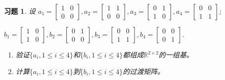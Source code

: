 \documentclass[UTF8]{ctexart}
\newtheorem{ex}[thm]{习题}
\begin{document}
\begin{ex} %
设 $a_{1} = \begin{bmatrix}
1 & 0 \\
0 & 0
\end{bmatrix}, a_{2} =\begin{bmatrix}
1 & 1 \\
0 & 0
\end{bmatrix}, a_{3} =\begin{bmatrix}
0 & 1 \\
1 & 0
\end{bmatrix}, a_{4} = \begin{bmatrix}
0 & 0 \\
1 & 1
\end{bmatrix}$;
\

$b_{1} = \begin{bmatrix}
1 & 0 \\
1 & 0
\end{bmatrix}, b_{2} =\begin{bmatrix}
0 & 1 \\
0 & 0
\end{bmatrix}, b_{3} =\begin{bmatrix}
0 & 0 \\
1 & 1
\end{bmatrix}, b_{4} = \begin{bmatrix}
0 & 0 \\
0 & 1
\end{bmatrix}$.
\begin{enumerate}
\item
验证$\{a_{i}, 1 \leq i \leq 4\}$和$\{b_{i}, 1 \leq i \leq 4\}$都组成$\mathbb{R}^{2 \times 2}$的一组基。
\item
计算$\{a_{i}, 1 \leq i \leq 4\}$到$\{b_{i}, 1 \leq i \leq 4\}$的过渡矩阵。
\end{enumerate}
\end{ex}
\end{document}
